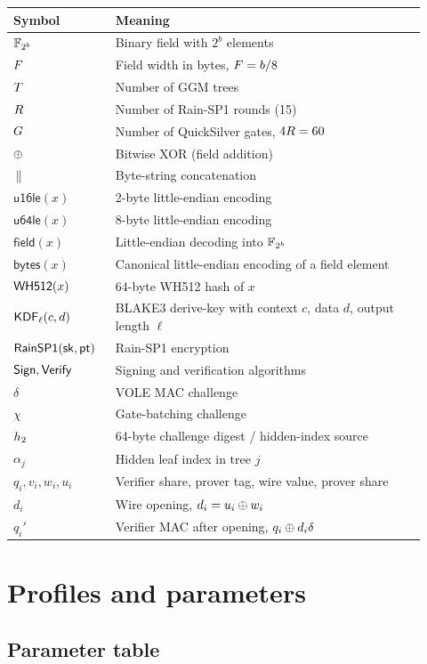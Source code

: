 \documentclass[11pt,a4paper]{article}
\begin{document}
\begin{longtable}{@{}p{0.22\linewidth}p{0.7\linewidth}@{}}
\toprule
Symbol & Meaning \\
\midrule
\endhead
$\mathbb{F}_{2^{b}}$ & Binary field with $2^b$ elements \\
$F$ & Field width in bytes, $F=b/8$ \\
$T$ & Number of GGM trees \\
$R$ & Number of Rain-SP1 rounds (15) \\
$G$ & Number of QuickSilver gates, $4R=60$ \\
$\oplus$ & Bitwise XOR (field addition) \\
$\,\|\,$ & Byte-string concatenation \\
$\mathsf{u16le}(x)$ & 2-byte little-endian encoding \\
$\mathsf{u64le}(x)$ & 8-byte little-endian encoding \\
$\mathsf{field}(x)$ & Little-endian decoding into $\mathbb{F}_{2^{b}}$ \\
$\mathsf{bytes}(x)$ & Canonical little-endian encoding of a field element \\
$\mathsf{WH512}(x)$ & 64-byte WH512 hash of $x$ \\
$\mathsf{KDF}_\ell(c,d)$ & BLAKE3 derive-key with context $c$, data $d$, output length $\ell$ \\
$\mathsf{RainSP1}(\mathsf{sk},\mathsf{pt})$ & Rain-SP1 encryption \\
$\mathsf{Sign},\mathsf{Verify}$ & Signing and verification algorithms \\
$\delta$ & VOLE MAC challenge \\
$\chi$ & Gate-batching challenge \\
$h_2$ & 64-byte challenge digest / hidden-index source \\
$\alpha_j$ & Hidden leaf index in tree $j$ \\
$q_i,v_i,w_i,u_i$ & Verifier share, prover tag, wire value, prover share \\
$d_i$ & Wire opening, $d_i=u_i\oplus w_i$ \\
$q_i'$ & Verifier MAC after opening, $q_i\oplus d_i\delta$ \\
\bottomrule
\end{longtable}

\section{Profiles and parameters}

\subsection{Parameter table}
\end{document}
